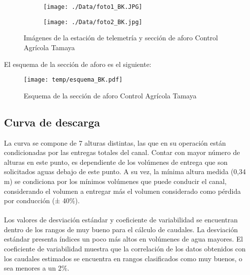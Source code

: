 \documentclass[]{article}
\begin{document}
\begin{figure}[H]
  \centering
\begin{subfigure}{.49\textwidth}
  \texttt{[image: ./Data/foto1\_BK.JPG]}
\end{subfigure}
\hfill
\begin{subfigure}{.49\textwidth}
  \texttt{[image: ./Data/foto2\_BK.jpg]}
\end{subfigure}
\caption{Imágenes de la estación de telemetría y sección de aforo Control Agrícola Tamaya}
\label{fig:fotos_37}
\end{figure}

El esquema de la sección de aforo es el siguiente:

\begin{figure}[H]
  \centering
  \texttt{[image: temp/esquema\_BK.pdf]}
\caption{Esquema de la sección de aforo Control Agrícola Tamaya}
\label{fig:Esquema_BK}
\end{figure}

\subsection{Curva de descarga}\label{curva-de-descarga-36}

La curva se compone de 7 alturas distintas, las que en su operación están condicionadas por las entregas totales del canal. Contar con mayor número de alturas en este punto, es dependiente de los volúmenes de entrega que son solicitados aguas debajo de este punto. A su vez, la mínima altura medida (0,34 m) se condiciona por los mínimos volúmenes que puede conducir el canal, considerando el volumen a entregar más el volumen considerado como pérdida por conducción (± 40\%).\\
\\
Los valores de desviación estándar y coeficiente de variabilidad se encuentran dentro de los rangos de muy bueno para el cálculo de caudales. La desviación estándar presenta índices un poco más altos en volúmenes de agua mayores. El coeficiente de variabilidad muestra que la correlación de los datos obtenidos con los caudales estimados se encuentra en rangos clasificados como muy buenos, o sea menores a un 2\%.
\end{document}
